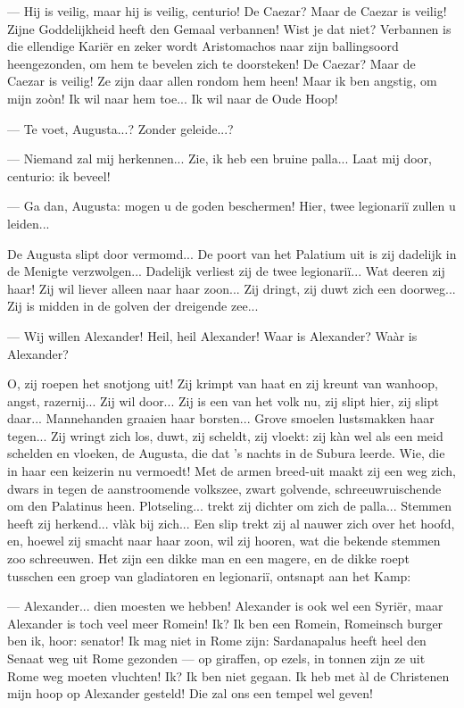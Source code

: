 \documentclass[a4paper, 12pt, oneside, dutch]{article}
\begin{document}
--- Hij is veilig, maar hij is veilig, centurio! De Caezar? Maar de Caezar is veilig! Zijne Goddelijkheid heeft den Gemaal verbannen! Wist je dat niet? Verbannen is die ellendige Kariër en zeker wordt Aristomachos naar zijn ballingsoord heengezonden, om hem te bevelen zich te doorsteken! De Caezar? Maar de Caezar is veilig! Ze zijn daar allen rondom hem heen! Maar ik ben angstig, om mijn zoòn! Ik wil naar hem toe... Ik wil naar de Oude Hoop!

--- Te voet, Augusta...? Zonder geleide...?

--- Niemand zal mij herkennen... Zie, ik heb een bruine palla... Laat mij door, centurio: ik beveel!

--- Ga dan, Augusta: mogen u de goden beschermen! Hier, twee legionariï zullen u leiden...

De Augusta slipt door vermomd... De poort van het Palatium uit is zij dadelijk in de Menigte verzwolgen... Dadelijk verliest zij de twee legionariï... Wat deeren zij haar! Zij wil liever alleen naar haar zoon... Zij dringt, zij duwt zich een doorweg... Zij is midden in de golven der dreigende zee...

--- Wij willen Alexander! Heil, heil Alexander! Waar is Alexander? Waàr is Alexander?

O, zij roepen het snotjong uit! Zij krimpt van haat en zij kreunt van wanhoop, angst, razernij... Zij wil door... Zij is een van het volk nu, zij slipt hier, zij slipt daar... Mannehanden graaien haar borsten... Grove smoelen lustsmakken haar tegen... Zij wringt zich los, duwt, zij scheldt, zij vloekt: zij kàn wel als een meid schelden en vloeken, de Augusta, die dat 's nachts in de Subura leerde. Wie, die in haar een keizerin nu vermoedt! Met de armen breed-uit maakt zij een weg zich, dwars in tegen de aanstroomende volkszee, zwart golvende, schreeuwruischende om den Palatinus heen. Plotseling... trekt zij dichter om zich de palla... Stemmen heeft zij herkend... vlàk bij zich... Een slip trekt zij al nauwer zich over het hoofd, en, hoewel zij smacht naar haar zoon, wil zij hooren, wat die bekende stemmen zoo schreeuwen. Het zijn een dikke man en een magere, en de dikke roept tusschen een groep van gladiatoren en legionariï, ontsnapt aan het Kamp:

--- Alexander... dien moesten we hebben! Alexander is ook wel een Syriër, maar Alexander is toch veel meer Romein! Ik? Ik ben een Romein, Romeinsch burger ben ik, hoor: senator! Ik mag niet in Rome zijn: Sardanapalus heeft heel den Senaat weg uit Rome gezonden --- op giraffen, op ezels, in tonnen zijn ze uit Rome weg moeten vluchten! Ik? Ik ben niet gegaan. Ik heb met àl de Christenen mijn hoop op Alexander gesteld! Die zal ons een tempel wel geven!
\end{document}
